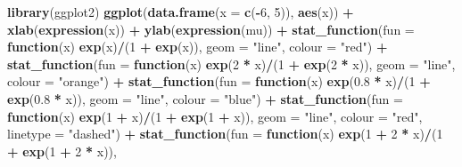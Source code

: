 \documentclass[10pt,ignorenonframetext,]{beamer}
\newenvironment{Shaded}{\begin{snugshade}}{\end{snugshade}}
\newcommand{\KeywordTok}[1]{\textcolor[rgb]{0.13,0.29,0.53}{\textbf{#1}}}
\newcommand{\DataTypeTok}[1]{\textcolor[rgb]{0.13,0.29,0.53}{#1}}
\newcommand{\DecValTok}[1]{\textcolor[rgb]{0.00,0.00,0.81}{#1}}
\newcommand{\FloatTok}[1]{\textcolor[rgb]{0.00,0.00,0.81}{#1}}
\newcommand{\StringTok}[1]{\textcolor[rgb]{0.31,0.60,0.02}{#1}}
\newcommand{\ControlFlowTok}[1]{\textcolor[rgb]{0.13,0.29,0.53}{\textbf{#1}}}
\newcommand{\OperatorTok}[1]{\textcolor[rgb]{0.81,0.36,0.00}{\textbf{#1}}}
\newcommand{\NormalTok}[1]{#1}
\begin{document}
\begin{frame}[fragile]
\begin{Shaded}
\begin{Highlighting}[]
\KeywordTok{library}\NormalTok{(ggplot2)}
\KeywordTok{ggplot}\NormalTok{(}\KeywordTok{data.frame}\NormalTok{(}\DataTypeTok{x =} \KeywordTok{c}\NormalTok{(}\OperatorTok{-}\DecValTok{6}\NormalTok{, }\DecValTok{5}\NormalTok{)), }\KeywordTok{aes}\NormalTok{(x)) }\OperatorTok{+}\StringTok{ }\KeywordTok{xlab}\NormalTok{(}\KeywordTok{expression}\NormalTok{(x)) }\OperatorTok{+}\StringTok{ }\KeywordTok{ylab}\NormalTok{(}\KeywordTok{expression}\NormalTok{(mu)) }\OperatorTok{+}\StringTok{ }
\StringTok{    }\KeywordTok{stat_function}\NormalTok{(}\DataTypeTok{fun =} \ControlFlowTok{function}\NormalTok{(x) }\KeywordTok{exp}\NormalTok{(x)}\OperatorTok{/}\NormalTok{(}\DecValTok{1} \OperatorTok{+}\StringTok{ }\KeywordTok{exp}\NormalTok{(x)), }\DataTypeTok{geom =} \StringTok{"line"}\NormalTok{, }
        \DataTypeTok{colour =} \StringTok{"red"}\NormalTok{) }\OperatorTok{+}\StringTok{ }\KeywordTok{stat_function}\NormalTok{(}\DataTypeTok{fun =} \ControlFlowTok{function}\NormalTok{(x) }\KeywordTok{exp}\NormalTok{(}\DecValTok{2} \OperatorTok{*}\StringTok{ }\NormalTok{x)}\OperatorTok{/}\NormalTok{(}\DecValTok{1} \OperatorTok{+}\StringTok{ }
\StringTok{    }\KeywordTok{exp}\NormalTok{(}\DecValTok{2} \OperatorTok{*}\StringTok{ }\NormalTok{x)), }\DataTypeTok{geom =} \StringTok{"line"}\NormalTok{, }\DataTypeTok{colour =} \StringTok{"orange"}\NormalTok{) }\OperatorTok{+}\StringTok{ }\KeywordTok{stat_function}\NormalTok{(}\DataTypeTok{fun =} \ControlFlowTok{function}\NormalTok{(x) }\KeywordTok{exp}\NormalTok{(}\FloatTok{0.8} \OperatorTok{*}\StringTok{ }
\StringTok{    }\NormalTok{x)}\OperatorTok{/}\NormalTok{(}\DecValTok{1} \OperatorTok{+}\StringTok{ }\KeywordTok{exp}\NormalTok{(}\FloatTok{0.8} \OperatorTok{*}\StringTok{ }\NormalTok{x)), }\DataTypeTok{geom =} \StringTok{"line"}\NormalTok{, }\DataTypeTok{colour =} \StringTok{"blue"}\NormalTok{) }\OperatorTok{+}\StringTok{ }\KeywordTok{stat_function}\NormalTok{(}\DataTypeTok{fun =} \ControlFlowTok{function}\NormalTok{(x) }\KeywordTok{exp}\NormalTok{(}\DecValTok{1} \OperatorTok{+}\StringTok{ }
\StringTok{    }\NormalTok{x)}\OperatorTok{/}\NormalTok{(}\DecValTok{1} \OperatorTok{+}\StringTok{ }\KeywordTok{exp}\NormalTok{(}\DecValTok{1} \OperatorTok{+}\StringTok{ }\NormalTok{x)), }\DataTypeTok{geom =} \StringTok{"line"}\NormalTok{, }\DataTypeTok{colour =} \StringTok{"red"}\NormalTok{, }\DataTypeTok{linetype =} \StringTok{"dashed"}\NormalTok{) }\OperatorTok{+}\StringTok{ }
\StringTok{    }\KeywordTok{stat_function}\NormalTok{(}\DataTypeTok{fun =} \ControlFlowTok{function}\NormalTok{(x) }\KeywordTok{exp}\NormalTok{(}\DecValTok{1} \OperatorTok{+}\StringTok{ }\DecValTok{2} \OperatorTok{*}\StringTok{ }\NormalTok{x)}\OperatorTok{/}\NormalTok{(}\DecValTok{1} \OperatorTok{+}\StringTok{ }\KeywordTok{exp}\NormalTok{(}\DecValTok{1} \OperatorTok{+}\StringTok{ }\DecValTok{2} \OperatorTok{*}\StringTok{ }\NormalTok{x)), }

\end{Highlighting}
\end{Shaded}
\end{frame}
\end{document}
